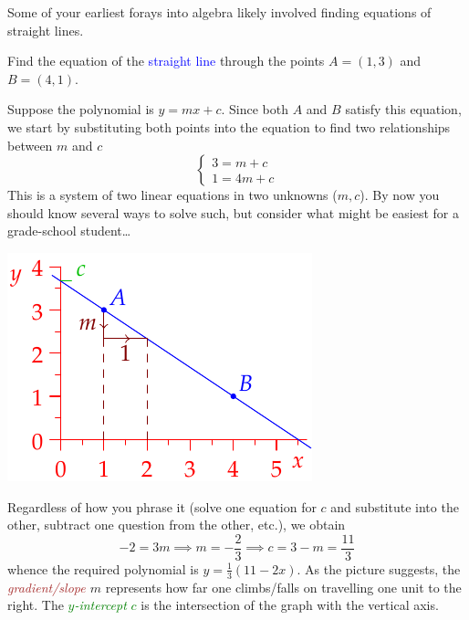 Some of your earliest forays into algebra likely involved finding equations of straight lines.

\begin{example}{}{}
	Find the equation of the \textcolor{blue}{straight line} through the points $A=(1,3)$ and $B=(4,1)$.
	\par
	\begin{minipage}[t]{0.64\linewidth}\vspace{-5pt}
		Suppose the polynomial is $y=mx+c$. Since both $A$ and $B$ satisfy this equation, we start by substituting both points into the equation to find two relationships between $m$ and $c$
		\[
			\begin{cases}
				3=m+c\\
				1=4m+c
			\end{cases}
		\]
		This is a system of two linear equations in two unknowns ($m,c$). By now you should know several ways to solve such, but consider what might be easiest for a grade-school student\ldots
	\end{minipage}
	\hfill
	\begin{minipage}[t]{0.35\linewidth}\vspace{0pt}
		\flushright\includegraphics{line-line}
	\end{minipage}
	\medbreak 
	Regardless of how you phrase it (solve one equation for $c$ and substitute into the other, subtract one question from the other, etc.), we obtain
	\[
		-2=3m\implies m=-\frac 23\implies c=3-m=\frac{11}3
	\]
	whence the required polynomial is $y=\frac 13(11-2x)$.\smallbreak
	As the picture suggests, the \emph{\textcolor{Brown}{gradient/slope} $m$} represents how far one climbs/falls on travelling one unit to the right.	The \textcolor{Green}{\emph{$y$-intercept} $c$} is the intersection of the graph with the vertical axis.
\end{example}

